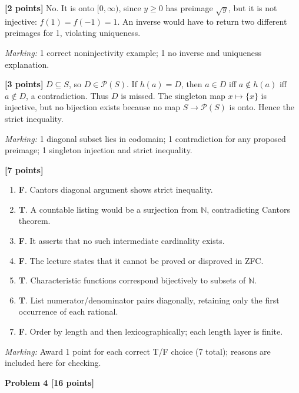 \documentclass[12pt,letterpaper]{article}
\newcommand{\problemheading}[2][5\baselineskip]{\Needspace{#1}\par\noindent\hspace*{-0.625in}\textbf{#2}\par\nobreak\vspace{0.3em}}
\begin{document}
\begin{description}[font=\normalfont,leftmargin=1.2em,labelsep=0.4em]
\item[(a)] \textbf{[2 points]} No. It is onto $[0,\infty)$, since $y\ge0$ has preimage $\sqrt y$, but it is not injective: $f(1)=f(-1)=1$. An inverse would have to return two different preimages for 1, violating uniqueness.
\par\textit{Marking:} 1 correct noninjectivity example; 1 no inverse and uniqueness explanation.
\item[(b)] \textbf{[3 points]} $D\subseteq S$, so $D\in\mathcal P(S)$. If $h(a)=D$, then $a\in D$ iff $a\notin h(a)$ iff $a\notin D$, a contradiction. Thus $D$ is missed. The singleton map $x\mapsto\{x\}$ is injective, but no bijection exists because no map $S\to\mathcal P(S)$ is onto. Hence the strict inequality.
\par\textit{Marking:} 1 diagonal subset lies in codomain; 1 contradiction for any proposed preimage; 1 singleton injection and strict inequality.
\item[(c)] \textbf{[7 points]} \begin{enumerate}[label=(\roman*)]\item \textbf{F}. Cantor\textquotesingle s diagonal argument shows strict inequality.\item \textbf{T}. A countable listing would be a surjection from $\mathbb N$, contradicting Cantor\textquotesingle s theorem.\item \textbf{F}. It asserts that no such intermediate cardinality exists.\item \textbf{F}. The lecture states that it cannot be proved or disproved in ZFC.\item \textbf{T}. Characteristic functions correspond bijectively to subsets of $\mathbb N$.\item \textbf{T}. List numerator/denominator pairs diagonally, retaining only the first occurrence of each rational.\item \textbf{F}. Order by length and then lexicographically; each length layer is finite.\end{enumerate}
\par\textit{Marking:} Award 1 point for each correct T/F choice (7 total); reasons are included here for checking.
\end{description}
\vspace{0.65em}
\problemheading[\dimexpr 3\baselineskip+4\baselineskip\relax]{Problem 4 [16 points]}
\end{document}

